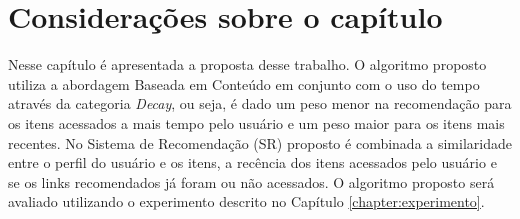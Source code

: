 \section{Considerações sobre o capítulo}

Nesse capítulo é apresentada a proposta desse trabalho. O algoritmo proposto utiliza a abordagem Baseada em Conteúdo em
conjunto com o uso do tempo através da categoria \textit{Decay}, ou seja, é dado um peso menor na recomendação para os
itens acessados a mais tempo pelo usuário e um peso maior para os itens mais recentes. No Sistema de Recomendação (SR)
proposto é combinada a similaridade entre o perfil do usuário e os itens, a recência dos itens acessados pelo usuário e
se os links recomendados já foram ou não acessados. O algoritmo proposto será avaliado utilizando o experimento descrito
no Capítulo \ref{chapter:experimento}.


